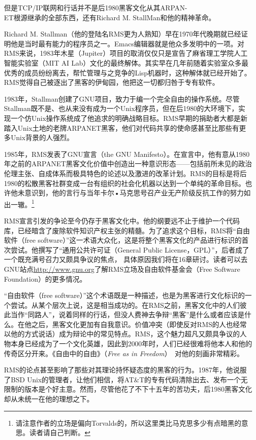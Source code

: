 \documentclass[12pt,oneside]{ctexbook}
\begin{document}
\begin{common-format}
但是TCP/IP联网和行话并不是后1980黑客文化从其ARPAN-\\ET根源继承的全部东西，还有Richard M. StallMan和他的精神革命。

Richard M. Stallman（他的登陆名RMS更为人熟知）早在1970年代晚期就已经证明他是当时最有能力的程序员之一。Emacs编辑器就是他众多发明中的一项。对RMS来说，1983年木星（Jupiter）项目的取消仅仅只是宣告了麻省理工学院人工智能实验室（MIT AI Lab）文化的最终解体。其实早在几年前随着实验室众多最优秀的成员纷纷离去，帮忙管理与之竞争的Lisp机器时，这种解体就已经开始了。RMS觉得自己被逐出了黑客的伊甸园，他把这一切都归咎于专有软件。

1983年，Stallman创建了GNU项目，致力于编一个完全自由的操作系统。尽管Stallman既不是、也从来没有成为一个Unix程序员，但在后1980的大环境下，实现一个仿Unix操作系统成了他追求的明确战略目标。RMS早期的捐助者大都是新踏入Unix土地的老牌ARPANET黑客，他们对代码共享的使命感甚至比那些有更多Unix背景的人强烈。

1985年，RMS发表了GNU宣言（the GNU Manifesto）。在宣言中，他有意从1980年之前的ARPANET黑客文化价值中创造出一种意识形态——包括前所未见的政治伦理主张、自成体系而极具特色的论述以及激进的改革计划。RMS的目标是将后1980的松散黑客社群变成一台有组织的社会化机器以达到一个单纯的革命目标。也许他未意识到，他的言行与当年卡尔•马克思号召产业无产阶级反抗工作的努力如出一辙。\footnote{请注意作者的立场是偏向Torvalds的，所以这里类比马克思多少有点暗黑的意思。读者请自己判断。}

RMS宣言引发的争论至今仍存于黑客文化中。他的纲要远不止于维护一个代码库，已经暗含了废除软件知识产权主张的精髓。为了追求这个目标，RMS将“自由软件（free software）”这一术语大众化，这是将整个黑客文化的产品进行标识的首次尝试。他撰写了“通用公共许可证（General Public License，GPL）”，后者成了一个既充满号召力又颇具争议的焦点，  具体原因我们将在16章研讨。读者可以去GNU站点\href{http://www.gnu.org}{http://www.gnu.org}了解RMS立场及自由软件基金会（Free Software Foundation）的更多情况。

“自由软件（free  software）”这个术语既是一种描述，也是为黑客进行文化标识的一个尝试。从某个层次上说，这是相当成功的。在RMS之前，黑客文化中的人们彼此当作“同路人”，说着同样的行话，但没人费神去争辩“黑客”是什么或者应该是什么。在他之后，黑客文化更加有自我意识。价值冲突（即使反对RMS的人也经常以他的方式说话）成为辩论中的常见特点。RMS，这个魅力超凡又颇具争议的人物本身已经成为了一个文化英雄，因此到2000年时，人们已经很难将他本人和他的传奇区分开来。《自由中的自由》（\textit{Free as in Freedom}）~\cite{Williams}对他的刻画非常精彩。

RMS的论点甚至影响了那些对其理论持怀疑态度的黑客的行为。1987年，他说服了BSD Unix的管理者，让他们相信，将AT\&{}T的专有代码清除出去、发布一个无限制的版本是个好主意。然而，尽管他花了不下十五年的苦功夫，后1980黑客文化却从未统一在他的理想之下。


\end{common-format}
\end{document}
